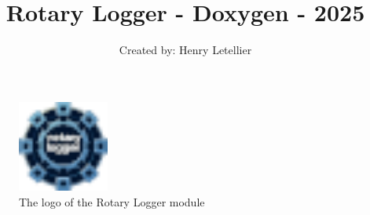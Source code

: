 \documentclass{article}
\title{Rotary Logger - Doxygen - 2025}
\author{Created by: Henry Letellier}
\date{} %
\begin{document}
\maketitle

\begin{figure}[h]
    \centering
    \includegraphics[width=3cm]{./files/icon/favicon.png}
    \caption*{The logo of the Rotary Logger module}
\end{figure}
\end{document}
